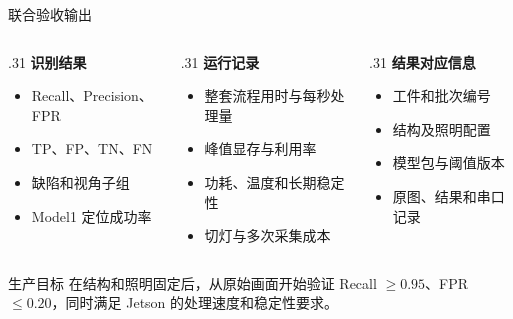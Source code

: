 \documentclass[aspectratio=169,10pt]{beamer}
\begin{document}
\begin{frame}{联合验收输出}
  \begin{columns}[T,onlytextwidth]
    \begin{column}{.31\textwidth}
      \textbf{识别结果}
      \begin{itemize}
        \item Recall、Precision、FPR
        \item TP、FP、TN、FN
        \item 缺陷和视角子组
        \item Model1 定位成功率
      \end{itemize}
    \end{column}
    \begin{column}{.31\textwidth}
      \textbf{运行记录}
      \begin{itemize}
        \item 整套流程用时与每秒处理量
        \item 峰值显存与利用率
        \item 功耗、温度和长期稳定性
        \item 切灯与多次采集成本
      \end{itemize}
    \end{column}
    \begin{column}{.31\textwidth}
      \textbf{结果对应信息}
      \begin{itemize}
        \item 工件和批次编号
        \item 结构及照明配置
        \item 模型包与阈值版本
        \item 原图、结果和串口记录
      \end{itemize}
    \end{column}
  \end{columns}

  \vfill
  \begin{block}{生产目标}
    在结构和照明固定后，从原始画面开始验证 Recall $\geq 0.95$、FPR $\leq 0.20$，同时满足 Jetson 的处理速度和稳定性要求。
  \end{block}
\end{frame}

\end{document}
